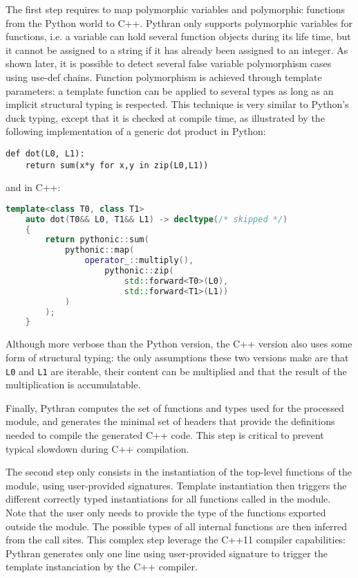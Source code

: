 \documentclass[10pt, onecolumn, preprint]{sigplanconf}
\begin{document}
The first step requires to map polymorphic variables and polymorphic functions
from the Python world to C++. Pythran only supports polymorphic variables for
functions, i.e. a variable can hold several function objects during its life
time, but it cannot be assigned to a string if it has already been assigned to
an integer.  As shown later, it is possible to detect several false variable
polymorphism cases using use-def chains. Function polymorphism is achieved
through template parameters: a template function can be applied to several
types as long as an implicit structural typing is respected. This technique is
very similar to Python's duck typing, except that it is checked at compile
time, as illustrated by the following implementation of a generic dot product
in Python:

\begin{lstlisting}
def dot(L0, L1):
    return sum(x*y for x,y in zip(L0,L1))
\end{lstlisting}

\noindent and in C++:

\begin{lstlisting}[language=c++]
template<class T0, class T1>
    auto dot(T0&& L0, T1&& L1) -> decltype(/* skipped */)
    {
        return pythonic::sum(
            pythonic::map(
                operator_::multiply(),
                    pythonic::zip(
                        std::forward<T0>(L0),
                        std::forward<T1>(L1))
            )
        );
    }
\end{lstlisting}

Although more verbose than the Python version, the C++ version also uses some
form of structural typing: the only assumptions these two versions make are
that \texttt{L0} and \texttt{L1} are iterable, their content can be multiplied
and that the result of the multiplication is accumulatable.

Finally, Pythran computes the set of functions and types used for the processed
module, and generates the minimal set of headers that provide the definitions
needed to compile the generated C++ code. This step is critical to prevent
typical slowdown during C++ compilation.

The second step only consists in the instantiation of the top-level functions
of the module, using user-provided signatures. Template instantiation then
triggers the different correctly typed instantiations for all functions called
in the module. Note that the user only needs to provide the type of the
functions exported outside the module. The possible types of all internal
functions are then inferred from the call sites. This complex step leverage the
C++11 compiler capabilities: Pythran generates only one line using
user-provided signature to trigger the template instanciation by the C++
compiler.
\end{document}
